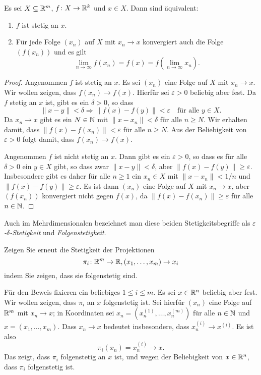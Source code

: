 \documentclass[a4paper,10pt]{article}
\begin{document}
\begin{lem}
 Es sei $X \subseteq \mathbb{R}^m$, $f \colon X \to \mathbb{R}^k$ und $x \in X$. Dann sind äquivalent:
 \begin{enumerate}
  \item
   $f$ ist stetig an $x$.
  \item
   Für jede Folge $(x_n)$ auf $X$ mit $x_n \to x$ konvergiert auch die Folge $(f(x_n))$ und es gilt
   \[
    \lim_{n \to \infty} f(x_n) = f(x) = f\left( \lim_{n \to \infty} x_n \right).
   \]
 \end{enumerate}
\end{lem}
\begin{proof}
 Angenommen $f$ ist stetig an $x$. Es sei $(x_n)$ eine Folge auf $X$ mit $x_n \to x$. Wir wollen zeigen, dass $f(x_n) \to f(x)$. Hierfür sei $\varepsilon > 0$ beliebig aber fest. Da $f$ stetig an $x$ ist, gibt es ein $\delta > 0$, so dass
 \[
  \|x-y\| < \delta \Rightarrow \|f(x) - f(y)\| < \varepsilon \quad \text{für alle $y \in X$}.
 \]
 Da $x_n \to x$ gibt es ein $N \in \mathbb{N}$ mit $\|x - x_n\| < \delta$ für alle $n \geq N$. Wir erhalten damit, dass $\|f(x) - f(x_n)\| < \varepsilon$ für alle $n \geq N$. Aus der Beliebigkeit von $\varepsilon > 0$ folgt damit, dass $f(x_n) \to f(x)$.
 
 Angenommen $f$ ist nicht stetig an $x$. Dann gibt es ein $\varepsilon > 0$, so dass es für alle $\delta > 0$ ein $y \in X$ gibt, so dass zwar $\|x-y\| < \delta$, aber $\|f(x)-f(y)\| \geq \varepsilon$. Insbesondere gibt es daher für alle $n \geq 1$ ein $x_n \in X$ mit $\|x - x_n\| < 1/n$ und $\|f(x) - f(y)\| \geq \varepsilon$. Es ist dann $(x_n)$ eine Folge auf $X$ mit $x_n \to x$, aber $(f(x_n))$ konvergiert nicht gegen $f(x)$, da $\|f(x) - f(x_n)\| \geq \varepsilon$ für alle $n \in \mathbb{N}$.
\end{proof}


Auch im Mehrdimensionalen bezeichnet man diese beiden Stetigkeitsbegriffe als \emph{$\varepsilon$-$\delta$-Stetigkeit} und \emph{Folgenstetigkeit}.


\begin{question}
 Zeigen Sie erneut die Stetigkeit der Projektionen
 \[
  \pi_i \colon \mathbb{R}^m \to \mathbb{R}, (x_1, \dotsc, x_m) \to x_i
 \]
 indem Sie zeigen, dass sie folgenstetig sind.
\end{question}
\begin{solution}
 Für den Beweis fixieren ein beliebiges $1 \leq i \leq m$. Es sei $x \in \mathbb{R}^n$ beliebig aber fest. Wir wollen zeigen, dass $\pi_i$ an $x$ folgenstetig ist. Sei hierfür $(x_n)$ eine Folge auf $\mathbb{R}^m$ mit $x_n \to x$; in Koordinaten sei $x_n = (x^{(1)}_n, \dotsc, x^{(m)}_n)$ für alle $n \in \mathbb{N}$ und $x = (x_1, \dotsc, x_m)$. Dass $x_n \to x$ bedeutet insbesondere, dass $x^{(i)}_n \to x^{(i)}$. Es ist also
 \[
  \pi_i(x_n) = x^{(i)}_n \to x.
 \]
 Das zeigt, dass $\pi_i$ folgenstetig an $x$ ist, und wegen der Beliebigkeit von $x \in \mathbb{R}^n$, dass $\pi_i$ folgenstetig ist.
\end{solution}
\end{document}
